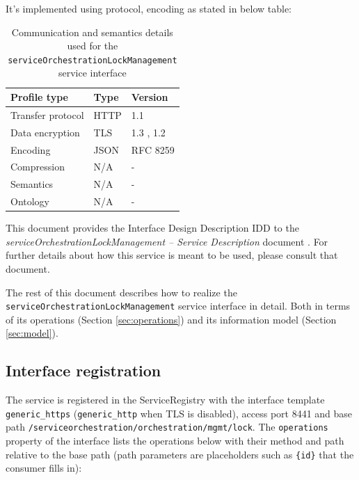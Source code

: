 \documentclass[a4paper]{arrowhead}
\begin{document}
It's implemented using protocol, encoding as stated in below table:
\begin{table}[ht!]
  \centering
  \begin{tabular}{|l|l|l|}
    \hline
    \rowcolor{gray!33} Profile type & Type & Version \\ \hline
    Transfer protocol & HTTP & 1.1 \cite{rfc9112} \\ \hline
    Data encryption & TLS & 1.3 \cite{rfc8446}, 1.2 \cite{rfc5246} \\ \hline
    Encoding & JSON & RFC 8259 \cite{rfc8259} \\ \hline
    Compression & N/A & - \\ \hline
    Semantics & N/A & - \\ \hline
    Ontology & N/A & - \\ \hline
  \end{tabular}
  \caption{Communication and semantics details used for the \texttt{service\allowbreak{}Orchestration\allowbreak{}Lock\allowbreak{}Management} service interface}
  \label{tab:comunication_semantics_profile}
\end{table}

This document provides the Interface Design Description IDD to the \textit{serviceOrchestrationLockManagement -- Service Description} document \cite{dso-serviceOrchestrationLockManagement-sd}.
For further details about how this service is meant to be used, please consult that document.

The rest of this document describes how to realize the \texttt{service\allowbreak{}Orchestration\allowbreak{}Lock\allowbreak{}Management} service
interface in detail. Both in terms of its operations (Section \ref{sec:operations}) and its information model (Section \ref{sec:model}).

\subsection{Interface registration}

The service is registered in the ServiceRegistry with the interface template \texttt{generic\_\allowbreak{}https} (\texttt{generic\_\allowbreak{}http} when TLS is disabled), access port 8441 and base path \texttt{/\allowbreak{}serviceorchestration/\allowbreak{}orchestration/\allowbreak{}mgmt/\allowbreak{}lock}. The \texttt{operations} property of the interface lists the operations below with their method and path relative to the base path (path parameters are placeholders such as \texttt{\{id\}} that the consumer fills in):
\end{document}

